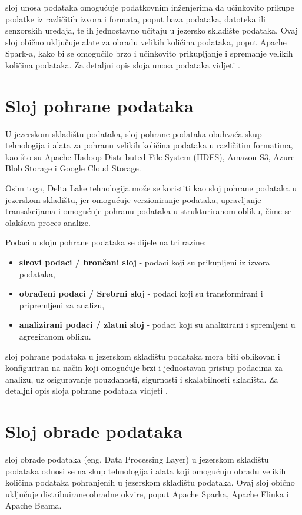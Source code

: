 sloj unosa podataka omogućuje podatkovnim inženjerima da učinkovito prikupe
podatke iz različitih izvora i formata, poput baza podataka, datoteka ili
senzorskih uređaja, te ih jednostavno učitaju u jezersko skladište podataka.
Ovaj sloj obično uključuje alate za obradu velikih količina podataka, poput
Apache Spark-a, kako bi se omogućilo brzo i učinkovito prikupljanje i spremanje
velikih količina podataka. Za detaljni opis sloja unosa podataka vidjeti
\cite{datalakehouse2022}.

\section{Sloj pohrane podataka} \label{section:sloj_pohrane_podataka}

U jezerskom skladištu podataka, sloj pohrane podataka obuhvaća skup tehnologija
i alata za pohranu velikih količina podataka u različitim formatima, kao što su
Apache Hadoop Distributed File System (HDFS), Amazon S3, Azure Blob Storage i
Google Cloud Storage.

Osim toga, Delta Lake tehnologija može se koristiti kao sloj pohrane podataka u
jezerskom skladištu, jer omogućuje verzioniranje podataka, upravljanje
transakcijama i omogućuje pohranu podataka u strukturiranom obliku, čime se
olakšava proces analize.

Podaci u sloju pohrane podataka se dijele na tri razine:
\begin{itemize}
    \item \textbf{sirovi podaci / brončani sloj} - podaci koji su prikupljeni iz izvora podataka,
    \item \textbf{obrađeni podaci / Srebrni sloj} - podaci koji su transformirani i pripremljeni za analizu,
    \item \textbf{analizirani podaci / zlatni sloj} - podaci koji su analizirani i spremljeni u agregiranom obliku.
\end{itemize}

sloj pohrane podataka u jezerskom skladištu podataka mora biti oblikovan i
konfiguriran na način koji omogućuje brzi i jednostavan pristup podacima za
analizu, uz osiguravanje pouzdanosti, sigurnosti i skalabilnosti skladišta. Za
detaljni opis sloja pohrane podataka vidjeti \cite{datalakehouse2022}.

\section{Sloj obrade podataka} \label{section:sloj_obrade_podataka} sloj obrade
podataka (eng. Data Processing Layer) u jezerskom skladištu podataka odnosi se
na skup tehnologija i alata koji omogućuju obradu velikih količina podataka
pohranjenih u jezerskom skladištu podataka. Ovaj sloj obično uključuje
distribuirane obradne okvire, poput Apache Sparka, Apache Flinka i Apache
Beama.

